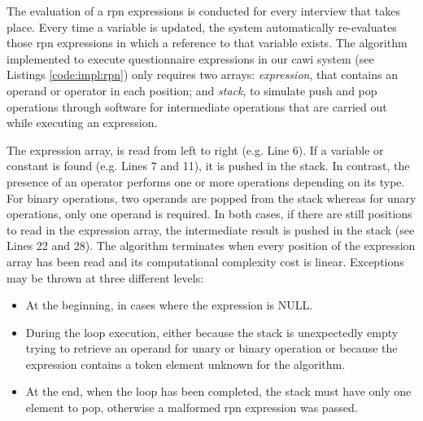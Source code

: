 	The evaluation of a \gls{rpn} expressions is conducted for every interview that takes place. Every time a variable is updated, the system automatically re-evaluates those \gls{rpn} expressions in which a reference to that variable exists. The algorithm implemented to execute questionnaire expressions in our \gls{cawi} system (see Listings \ref{code:impl:rpn}) only requires two arrays: \emph{expression}, that contains an operand or operator in each position; and \emph{stack}, to simulate push and pop operations through software \cite{web:brown01} for intermediate operations that are carried out while executing an expression.

	

	The expression array, is read from left to right (e.g. Line 6). If a variable or constant is found (e.g. Lines 7 and 11), it is pushed in the stack. In contrast, the presence of an operator performs one or more operations depending on its type. For binary operations, two operands are popped from the stack whereas for unary operations, only one operand is required. In both cases, if there are still positions to read in the expression array, the intermediate result is pushed in the stack (see Lines 22 and 28). The algorithm terminates when every position of the expression array has been read and its computational complexity cost is linear. Exceptions may be thrown at three different levels:

	\begin{itemize}
		\item At the beginning, in cases where the expression is NULL.
		\item During the loop execution, either because the stack is unexpectedly empty trying to retrieve an operand for unary or binary operation or because the expression contains a token element unknown for the algorithm.
		\item At the end, when the loop has been completed, the stack must have only one element to pop, otherwise a malformed \gls{rpn} expression was passed.
	\end{itemize}